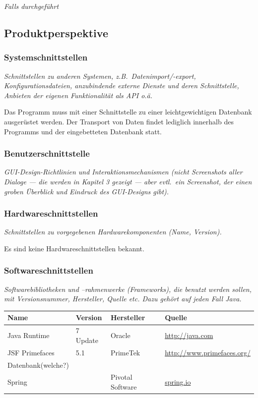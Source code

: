 \documentclass[fontsize=12pt,paper=a4,twoside]{scrartcl}
\begin{document}
{\em Falls durchgeführt}

\subsection{Produktperspektive}

  
\subsubsection{Systemschnittstellen}

  {\em Schnittstellen zu anderen Systemen, z.B.\ Datenimport/-export,
  Konfigurationsdateien, anzubindende externe Dienste und deren Schnittstelle,
  Anbieten der eigenen Funktionalität als API o.ä.}


Das Programm muss mit einer Schnittstelle zu einer leichtgewichtigen Datenbank ausgerüstet werden. Der Transport von Daten findet lediglich innerhalb des Programms und der eingebetteten Datenbank statt.
  

\subsubsection{Benutzerschnittstelle}


  {\em GUI-Design-Richtlinien und Interaktionsmechanismen (nicht
  Screenshots aller Dialoge --- die werden in Kapitel 3 gezeigt --- aber
  evtl.\ ein Screenshot, der einen groben Überblick und Eindruck des
  GUI-Designs gibt).}



\subsubsection{Hardwareschnittstellen}


  {\em Schnittstellen zu vorgegebenen Hardwarekomponenten (Name,
  Version).}

Es sind keine Hardwareschnittstellen bekannt.
 

\subsubsection{Softwareschnittstellen}


{\em Softwarebibliotheken und --rahmenwerke (Frameworks), die benutzt
  werden sollen, mit Versionsnummer, Hersteller, Quelle etc. Dazu
  gehört auf jeden Fall Java.}

  \begin{tabular}{|l|l|l|l|}\hline
    \textbf{Name} & \textbf{Version} & \textbf{Hersteller} & \textbf{Quelle} \\\hline
    Java Runtime & 7 Update  & Oracle & \url{http://java.com} \\\hline
    JSF Primefaces & 5.1 & PrimeTek &  
   \url{http://www.primefaces.org/}\\\hline
    Datenbank(welche?) & & & \\\hline
    Spring & & Pivotal Software & \url{spring.io}\\\hline
  \end{tabular}
\end{document}
